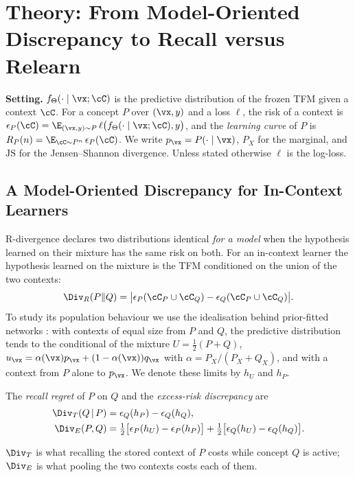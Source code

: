 
\section{Theory: From Model-Oriented Discrepancy to Recall versus Relearn}
\label{sec:theory}

\textbf{Setting.} $f_\Theta(\cdot\mid\vx;\cC)$ is the predictive distribution of the frozen TFM given a context $\cC$.
For a concept $P$ over $(\vx,y)$ and a loss $\ell$, the risk of a context is
$\epsilon_P(\cC)=\E_{(\vx,y)\sim P}\,\ell\bigl(f_\Theta(\cdot\mid\vx;\cC),y\bigr)$, and the \emph{learning curve} of $P$ is
$R_P(n)=\E_{\cC\sim P^n}\,\epsilon_P(\cC)$. We write $p_\vx=P(\cdot\mid\vx)$, $P_X$ for the marginal, and
$\mathrm{JS}$ for the Jensen--Shannon divergence. Unless stated otherwise $\ell$ is the log-loss.

\subsection{A Model-Oriented Discrepancy for In-Context Learners}

R-divergence \citep{zhao2023rdiv} declares two distributions identical \emph{for a model} when the hypothesis learned
on their mixture has the same risk on both. For an in-context learner the hypothesis learned on the mixture is the
TFM conditioned on the union of the two contexts:
\begin{equation}\label{eq:rdiv}
  \Div_R(P\|Q)=\bigl|\epsilon_P(\cC_P\cup\cC_Q)-\epsilon_Q(\cC_P\cup\cC_Q)\bigr| .
\end{equation}
To study its population behaviour we use the idealisation behind prior-fitted networks
\citep{muller2022pfn,nagler2023statistical}: with contexts of equal size from $P$ and $Q$, the predictive distribution
tends to the conditional of the mixture $U=\tfrac12(P+Q)$,
$u_\vx=\alpha(\vx)p_\vx+(1-\alpha(\vx))q_\vx$ with $\alpha=P_X/(P_X+Q_X)$, and with a context from $P$ alone to
$p_\vx$. We denote these limits by $h_U$ and $h_P$.

\begin{definition}\label{def:excess}
The \emph{recall regret} of $P$ on $Q$ and the \emph{excess-risk discrepancy} are
\begin{align}
  \Div_T(Q\,|\,P) &= \epsilon_Q(h_P)-\epsilon_Q(h_Q), \label{eq:transfer}\\
  \Div_E(P,Q) &= \tfrac12\bigl[\epsilon_P(h_U)-\epsilon_P(h_P)\bigr]+\tfrac12\bigl[\epsilon_Q(h_U)-\epsilon_Q(h_Q)\bigr].
  \label{eq:excess}
\end{align}
\end{definition}
$\Div_T$ is what recalling the stored context of $P$ costs while concept $Q$ is active; $\Div_E$ is what pooling the
two contexts costs each of them.

